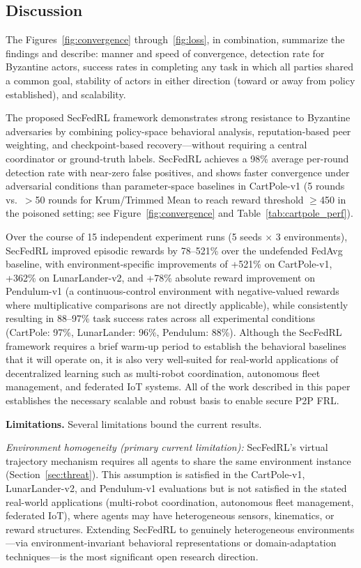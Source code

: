 \documentclass[12pt,a4paper]{article}
\begin{document}
\subsection{Discussion}

The Figures~\ref{fig:convergence} through~\ref{fig:loss}, in combination, summarize
the findings and describe: manner and speed of convergence, detection rate for
Byzantine actors, success rates in completing any task in which all parties shared a
common goal, stability of actors in either direction (toward or away from policy
established), and scalability.

The proposed SecFedRL framework demonstrates strong resistance to Byzantine adversaries
by combining policy-space behavioral analysis, reputation-based peer weighting, and
checkpoint-based recovery---without requiring a central coordinator or ground-truth
labels. SecFedRL achieves a 98\% average per-round detection rate with near-zero false
positives, and shows faster convergence under adversarial conditions than
parameter-space baselines in CartPole-v1 (5 rounds vs.\ $>$50 rounds for Krum/Trimmed
Mean to reach reward threshold $\geq$450 in the poisoned setting; see
Figure~\ref{fig:convergence} and Table~\ref{tab:cartpole_perf}).

Over the course of 15 independent experiment runs (5 seeds $\times$ 3 environments),
SecFedRL improved episodic rewards by 78--521\% over the undefended FedAvg baseline,
with environment-specific improvements of +521\% on CartPole-v1, +362\% on
LunarLander-v2, and +78\% absolute reward improvement on Pendulum-v1 (a
continuous-control environment with negative-valued rewards where multiplicative
comparisons are not directly applicable), while consistently resulting in 88--97\%
task success rates across all experimental conditions (CartPole: 97\%, LunarLander:
96\%, Pendulum: 88\%). Although the SecFedRL framework requires a brief warm-up period
to establish the behavioral baselines that it will operate on, it is also very
well-suited for real-world applications of decentralized learning such as multi-robot
coordination, autonomous fleet management, and federated IoT systems. All of the work
described in this paper establishes the necessary scalable and robust basis to enable
secure P2P FRL.

\noindent\textbf{Limitations.}
Several limitations bound the current results.

\textit{Environment homogeneity (primary current limitation):}
SecFedRL's virtual trajectory mechanism requires all agents to share the same environment
instance (Section~\ref{sec:threat}). This assumption is satisfied in the CartPole-v1,
LunarLander-v2, and Pendulum-v1 evaluations but is not satisfied in the stated real-world
applications (multi-robot coordination, autonomous fleet management, federated IoT),
where agents may have heterogeneous sensors, kinematics, or reward structures.
Extending SecFedRL to genuinely heterogeneous environments---via environment-invariant
behavioral representations or domain-adaptation techniques---is the most significant
open research direction.
\end{document}
